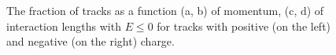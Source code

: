 \begin{figure}[htbp]
{}
\\
~
\caption{The fraction of tracks as a function (a, b) of momentum, (c, d) of interaction lengths with $E \leq 0$ for tracks with positive (on the left) and negative (on the right) charge.}
\label{fig:zerofracincl}
\end{figure}


